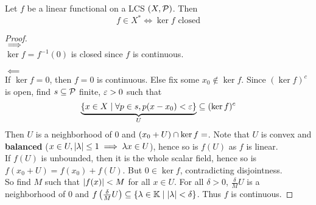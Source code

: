 \documentclass{article}
\begin{document}
\begin{lem}\label{lem:lcs-dual}
  Let $f$ be a linear functional on a LCS $(X, \mathcal P)$. Then
  $$f \in X^* \iff \ker f \text{ closed}$$
\end{lem}
\begin{proof}~\\
  $\implies$ \\
  $\ker f = f^{-1}(0)$ is closed since $f$ is continuous.
  
  $\impliedby$ \\
  If $\ker f = 0$, then $f = 0$ is continuous. Else fix some $x_0 \nin \ker f$. Since $(\ker f)^c$ is open, find $s \subseteq \mathcal P$ finite, $\varepsilon > 0$ such that
  $$\underbrace{\{x \in X \mid \forall p \in s, p(x - x_0) < \varepsilon\}}_U \subseteq (\ker f)^c$$
  Then $U$ is a neighborhood of $0$ and $(x_0 + U) \cap \ker f = \empty$. Note that $U$ is convex and {\bf balanced} ($x \in U, \left\lvert \lambda\right\rvert \le 1 \implies \lambda x \in U$), hence so is $f(U)$ as $f$ is linear. \\
  If $f(U)$ is unbounded, then it is the whole scalar field, hence so is $f(x_0 + U) = f(x_0) + f(U)$. But $0 \in \ker f$, contradicting disjointness. \\
  So find $M$ such that $\left\lvert f(x)\right\rvert < M$ for all $x \in U$. For all $\delta > 0$, $\frac\delta M U$ is a neighborhood of $0$ and $f\left(\frac\delta M U\right) \subseteq \{\lambda \in \mathbb K \mid \left\lvert \lambda\right\rvert < \delta\}$. Thus $f$ is continuous.
\end{proof}
\end{document}

